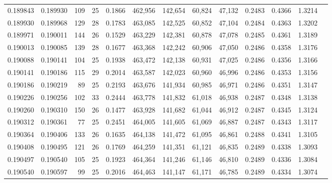 \begin{tabular}{rrrrrrrrrrrrr}
0.189843 & 0.189930 & 109 &  25 &                                     0.1866 & 462,956 & 142,654 &  60,824 &  47,132 & 0.2483 & 0.4366 & 1.3214 \\
0.189930 & 0.189968 & 129 &  28 &                                     0.1783 & 463,085 & 142,525 &  60,852 &  47,104 & 0.2484 & 0.4363 & 1.3202 \\
0.189971 & 0.190011 & 144 &  26 &                                     0.1529 & 463,229 & 142,381 &  60,878 &  47,078 & 0.2485 & 0.4361 & 1.3189 \\
0.190013 & 0.190085 & 139 &  28 &                                     0.1677 & 463,368 & 142,242 &  60,906 &  47,050 & 0.2486 & 0.4358 & 1.3176 \\
0.190088 & 0.190141 & 104 &  25 &                                     0.1938 & 463,472 & 142,138 &  60,931 &  47,025 & 0.2486 & 0.4356 & 1.3166 \\
0.190141 & 0.190186 & 115 &  29 &                                     0.2014 & 463,587 & 142,023 &  60,960 &  46,996 & 0.2486 & 0.4353 & 1.3156 \\
0.190186 & 0.190219 &  89 &  25 &                                     0.2193 & 463,676 & 141,934 &  60,985 &  46,971 & 0.2486 & 0.4351 & 1.3147 \\
0.190226 & 0.190256 & 102 &  33 &                                     0.2444 & 463,778 & 141,832 &  61,018 &  46,938 & 0.2487 & 0.4348 & 1.3138 \\
0.190260 & 0.190310 & 150 &  26 &                                     0.1477 & 463,928 & 141,682 &  61,044 &  46,912 & 0.2487 & 0.4345 & 1.3124 \\
0.190312 & 0.190361 &  77 &  25 &                                     0.2451 & 464,005 & 141,605 &  61,069 &  46,887 & 0.2487 & 0.4343 & 1.3117 \\
0.190364 & 0.190406 & 133 &  26 &                                     0.1635 & 464,138 & 141,472 &  61,095 &  46,861 & 0.2488 & 0.4341 & 1.3105 \\
0.190408 & 0.190495 & 121 &  26 &                                     0.1769 & 464,259 & 141,351 &  61,121 &  46,835 & 0.2489 & 0.4338 & 1.3093 \\
0.190497 & 0.190540 & 105 &  25 &                                     0.1923 & 464,364 & 141,246 &  61,146 &  46,810 & 0.2489 & 0.4336 & 1.3084 \\
0.190540 & 0.190597 &  99 &  25 &                                     0.2016 & 464,463 & 141,147 &  61,171 &  46,785 & 0.2489 & 0.4334 & 1.3074 \\

\end{tabular}
